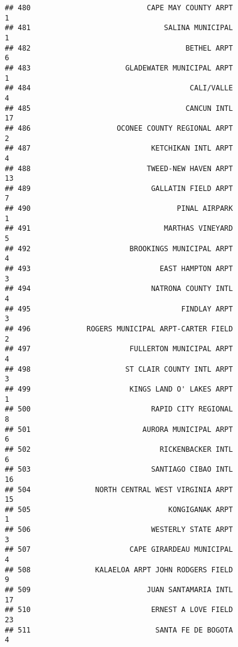 \documentclass[
]{article}
\begin{document}
\begin{verbatim}
## 480                           CAPE MAY COUNTY ARPT                           1
## 481                               SALINA MUNICIPAL                           1
## 482                                    BETHEL ARPT                           6
## 483                      GLADEWATER MUNICIPAL ARPT                           1
## 484                                     CALI/VALLE                           4
## 485                                    CANCUN INTL                          17
## 486                    OCONEE COUNTY REGIONAL ARPT                           2
## 487                            KETCHIKAN INTL ARPT                           4
## 488                           TWEED-NEW HAVEN ARPT                          13
## 489                            GALLATIN FIELD ARPT                           7
## 490                                  PINAL AIRPARK                           1
## 491                               MARTHAS VINEYARD                           5
## 492                       BROOKINGS MUNICIPAL ARPT                           4
## 493                              EAST HAMPTON ARPT                           3
## 494                            NATRONA COUNTY INTL                           4
## 495                                   FINDLAY ARPT                           3
## 496             ROGERS MUNICIPAL ARPT-CARTER FIELD                           2
## 497                       FULLERTON MUNICIPAL ARPT                           4
## 498                      ST CLAIR COUNTY INTL ARPT                           3
## 499                       KINGS LAND O' LAKES ARPT                           1
## 500                            RAPID CITY REGIONAL                           8
## 501                          AURORA MUNICIPAL ARPT                           6
## 502                              RICKENBACKER INTL                           6
## 503                            SANTIAGO CIBAO INTL                          16
## 504               NORTH CENTRAL WEST VIRGINIA ARPT                          15
## 505                                KONGIGANAK ARPT                           1
## 506                            WESTERLY STATE ARPT                           3
## 507                       CAPE GIRARDEAU MUNICIPAL                           4
## 508               KALAELOA ARPT JOHN RODGERS FIELD                           9
## 509                           JUAN SANTAMARIA INTL                          17
## 510                            ERNEST A LOVE FIELD                          23
## 511                             SANTA FE DE BOGOTA                           4

\end{verbatim}
\end{document}
